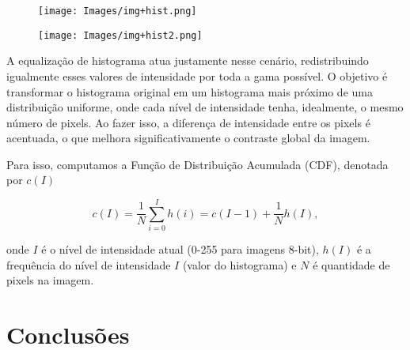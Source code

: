 \documentclass[12pt, a4paper]{article}
\begin{document}
\begin{figure}[H]
    \centering
    \texttt{[image: Images/img+hist.png]}
\end{figure}

\begin{figure}[H]
    \centering
    \texttt{[image: Images/img+hist2.png]}
\end{figure}

A equalização de histograma atua justamente nesse cenário, redistribuindo igualmente esses valores de intensidade por toda a gama possível. O objetivo é transformar o histograma original em um histograma mais próximo de uma distribuição uniforme, onde cada nível de intensidade tenha, idealmente, o mesmo número de pixels. Ao fazer isso, a diferença de intensidade entre os pixels é acentuada, o que melhora significativamente o contraste global da imagem.

Para isso, computamos a Função de Distribuição Acumulada (CDF), denotada por $c(I)$

\[
c(I) = \frac{1}{N}\sum_{i=0}^I h(i) = c(I-1) + \frac{1}{N}h(I),
\]

\noindent onde $I$ é o nível de intensidade atual (0-255 para imagens 8-bit), $h(I)$ é a frequência do nível de intensidade $I$ (valor do histograma) e $N$ é quantidade de pixels na imagem.





\section{Conclusões}




\end{document}
